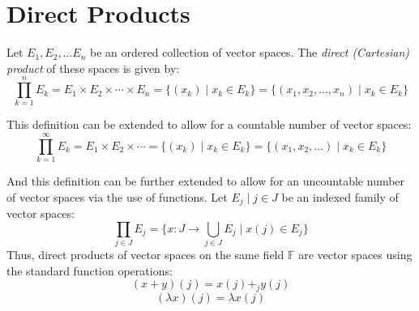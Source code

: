 \documentclass[letterpaper,12pt,fleqn]{article}
\renewcommand{\l}{\lambda}
\newcommand{\F}{\mathbb{F}}
\begin{document}
\section*{Direct Products}

\begin{definition}
  Let $E_1,E_2,\ldots E_n$ be an ordered collection of vector spaces. The
  \emph{direct (Cartesian) product} of these spaces is given by:
  \[\prod_{k=1}^nE_k=E_1\times E_2\times\cdots\times E_n=
  \{(x_k)\mid x_k\in E_k\}=\{(x_1,x_2,\ldots,x_n)\mid x_k\in E_k\}\]
\end{definition}

This definition can be extended to allow for a countable number of vector
spaces:
\[\prod_{k=1}^{\infty}E_k=E_1\times E_2\times\cdots=\{(x_k)\mid x_k\in E_k\}=
\{(x_1,x_2,\ldots)\mid x_k\in E_k\}\]

And this definition can be further extended to allow for an uncountable number
of vector spaces via the use of functions. Let ${E_j\mid j\in J}$ be an
indexed family of vector spaces:
\[\prod_{j\in J}E_j=\{x:J\to\bigcup_{j\in J}E_j\mid x(j)\in E_j\}\]
Thus, direct products of vector spaces on the same field $\F$ are vector spaces
using the standard function operations:
\[(x+y)(j)=x(j)+_j y(j)\]
\[(\l x)(j)=\l x(j)\]
\end{document}
